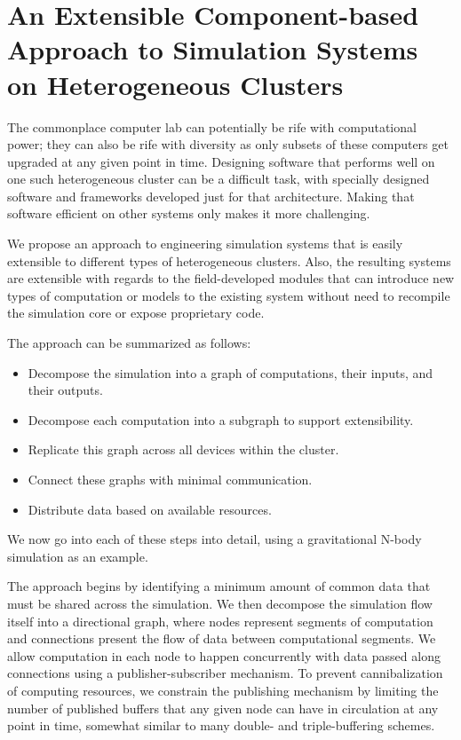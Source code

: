 \chapter{An Extensible Component-based Approach to Simulation Systems on Heterogeneous Clusters}
\label{chapter:approach}

The commonplace computer lab can potentially be rife with computational
power; they can also be rife with diversity as only subsets of these
computers get upgraded at any given point in time. Designing software
that performs well on one such heterogeneous cluster can be a difficult
task, with specially designed software and frameworks developed just
for that architecture. Making that software efficient on other systems
only makes it more challenging.

We propose an approach to engineering simulation systems that is easily
extensible to different types of heterogeneous clusters. Also, the
resulting systems are extensible with regards to the field-developed
modules that can introduce new types of computation or models to the
existing system without need to recompile the simulation core or expose
proprietary code.

The approach can be summarized as follows:
\begin{itemize}
  \item Decompose the simulation into a graph of computations, their inputs, and their outputs.
  \item Decompose each computation into a subgraph to support extensibility.
  \item Replicate this graph across all devices within the cluster.
  \item Connect these graphs with minimal communication.
  \item Distribute data based on available resources.
\end{itemize}
We now go into each of these steps into detail, using a gravitational N-body simulation as
an example. 

The approach begins by identifying a minimum amount of common data that
must be shared across the simulation. We then decompose the simulation
flow itself into a directional graph, where nodes represent segments of
computation and connections present the flow of data between computational
segments. We allow computation in each node to happen concurrently with
data passed along connections using a publisher-subscriber mechanism. To
prevent cannibalization of computing resources, we constrain the publishing
mechanism by limiting the number of published buffers that any given node
can have in circulation at any point in time, somewhat similar to many
double- and triple-buffering schemes.

